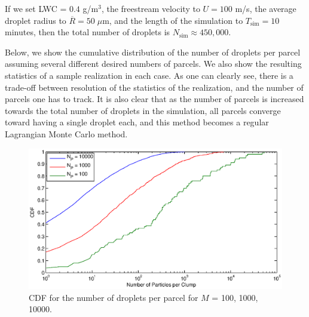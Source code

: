 \documentclass{article}
\begin{document}
If we set LWC = $0.4$ g/m$^3$, the freestream velocity to $U = 100$ m/s, the average droplet radius to $\overline{R} = 50 \; \mu$m, and the 
length of the simulation to $T_{\text{sim}} = 10$ minutes, then the total number of droplets is $N_{\text{sim}} \approx 450,000$. 

Below, we 
show the cumulative distribution of the number of droplets per parcel assuming several different desired numbers of parcels. We also 
show the resulting statistics of a sample realization in each case. As one can clearly see, there is a trade-off between resolution of the 
statistics of the realization, and the number of parcels one has to track. It is also clear that as the number of parcels is increased towards 
the total number of droplets in the simulation, all parcels converge toward having a single droplet each, and this method becomes a 
regular Lagrangian Monte Carlo method.
\begin{figure}
\centering
\includegraphics[width=.5\textwidth] {CDFClump.eps}
\caption{CDF for the number of droplets per parcel for $M$ = 100, 1000, 10000.}
\end{figure}
\end{document}
